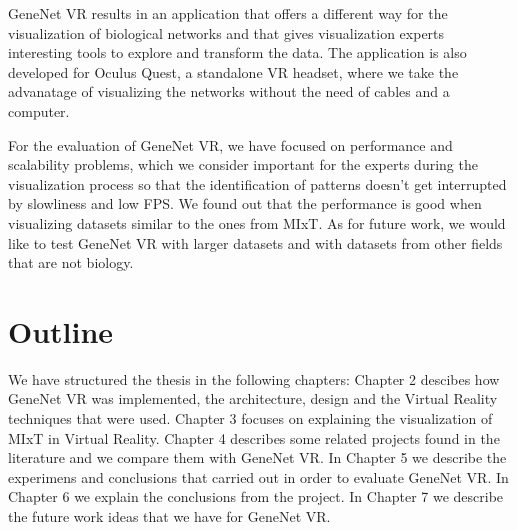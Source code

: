 GeneNet VR results in an application that offers a different way for the visualization of biological networks and that gives visualization experts interesting tools to explore and transform the data. The application is also developed for Oculus Quest, a standalone VR headset, where we take the advanatage of visualizing the networks without the need of cables and a computer.

For the evaluation of GeneNet VR, we have focused on performance and scalability problems, which we consider important for the experts during the visualization process so that the identification of patterns doesn't get interrupted by slowliness and low FPS. We found out that the performance is good when visualizing datasets similar to the ones from MIxT. As for future work, we would like to test GeneNet VR with larger datasets and with datasets from other fields that are not biology.

\section{Outline}

We have structured the thesis in the following chapters: Chapter 2 descibes how GeneNet VR was implemented, the architecture, design and the Virtual Reality techniques that were used. Chapter 3 focuses on explaining the visualization of MIxT in Virtual Reality. Chapter 4 describes some related projects found in the literature and we compare them with GeneNet VR. In Chapter 5 we describe the experimens and conclusions that carried out in order to evaluate GeneNet VR. In Chapter 6 we explain the conclusions from the project. In Chapter 7 we describe the future work ideas that we have for GeneNet VR.
